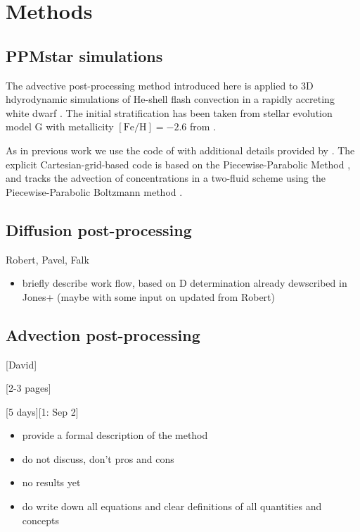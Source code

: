 \documentclass[fleqn,usenatbib]{mnras}
\begin{document}
\section{Methods}
\label{sec:allmethods}

\subsection{PPMstar simulations}
The advective post-processing method introduced here is applied to 3D hdyrodynamic simulations of He-shell flash convection in a rapidly accreting white dwarf \citep{Denissenkov:2017ba}. The initial stratification has been taken from stellar evolution model G with metallicity $\mathrm{[Fe/H]} = -2.6$ from \cite{2019MNRAS.488.4258D}. 

As in previous work \citep{Herwig:2014cx,Jones:2017kc} we use the \ppmstar{} code of \citet{woodward15} with additional details provided by \citet{Andrassy:2018wy}. The explicit
Cartesian-grid-based code is based on the
Piecewise-Parabolic Method \citep[PPM;][]{woodward_colella81,
woodward_colella84, colella_woodward84, woodward86, woodward07}, and  tracks the advection of concentrations in a two-fluid scheme using the Piecewise-Parabolic Boltzmann method \citep[PPB;][]{woodward86,woodward15}.

\subsection{Diffusion post-processing}
Robert, Pavel, Falk

\begin{itemize}
\item briefly describe work flow, based on D determination already dewscribed in Jones+ (maybe with some input on updated from Robert)
\end{itemize}


\subsection{Advection post-processing}

[David]

[2-3 pages]

[5 days][1: Sep 2]

\begin{itemize}
\item provide a formal description of the method
\item do not discuss, don't pros and cons
\item no results yet
\item do write down all equations and clear definitions of all quantities and concepts
\end{itemize}
\end{document}
